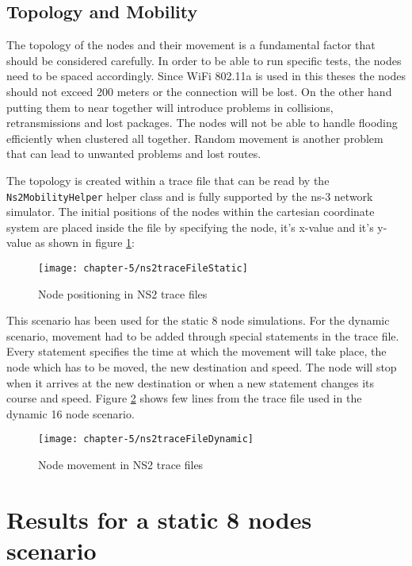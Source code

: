 \subsection{Topology and Mobility}

The topology of the nodes and their movement is a fundamental factor that should be considered carefully. In order to be able to run specific tests, the nodes need to be spaced accordingly. Since WiFi 802.11a is used in this theses the nodes should not exceed 200 meters or the connection will be lost. On the other hand putting them to near together will introduce problems in collisions, retransmissions and lost packages. The nodes will not be able to handle flooding efficiently when clustered all together. Random movement is another problem that can lead to unwanted problems and lost routes.
 
The topology is created within a trace file that can be read by the \texttt{Ns2MobilityHelper} helper class and is fully supported by the ns-3 network simulator. The initial positions of the nodes within the cartesian coordinate system are placed inside the file by specifying the node, it's x-value and it's y-value as shown in figure \ref{fig:ns2traceFileStatic}:

\begin{figure}[H]
  \centering
  \texttt{[image: chapter-5/ns2traceFileStatic]}
  \caption{Node positioning in NS2 trace files}
  \label{fig:ns2traceFileStatic}
\end{figure}

This scenario has been used for the static 8 node simulations. For the dynamic scenario, movement had to be added through special statements in the trace file. Every statement specifies the time at which the movement will take place, the node which has to be moved, the new destination and speed. The node will stop when it arrives at the new destination or when a new statement changes its course and speed. Figure \ref{fig:ns2traceFileDynamic} shows few lines from the trace file used in the dynamic 16 node scenario.

\begin{figure}[H]
  \centering
  \texttt{[image: chapter-5/ns2traceFileDynamic]}
  \caption{Node movement in NS2 trace files}
  \label{fig:ns2traceFileDynamic}
\end{figure}

\section{Results for a static 8 nodes scenario}

